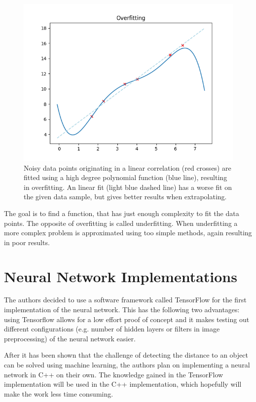 \begin{figure}[h!]
	\centering
	\includegraphics[width=4.5in]{img/methodology_neuralNetwork_overfitting.png}
	\caption{Noisy data points originating in a linear correlation (red crosses) are fitted using a high degree polynomial function (blue line), resulting in overfitting. An linear fit (light blue dashed line) has a worse fit on the given data sample, but gives better results when extrapolating.}
	\label{pic:methodology_neuralNetwork_overfitting}
\end{figure}

The goal is to find a function, that has just enough complexity to fit the data points. The opposite of overfitting is called underfitting. When underfitting a more complex problem is approximated using too simple methods, again resulting in poor results.

\section{Neural Network Implementations}
The authors decided to use a software framework called TensorFlow for the first implementation of the neural network. This has the following two advantages: using Tensorflow allows for a low effort proof of concept and it makes testing out different configurations (e.g. number of hidden layers or filters in image preprocessing) of the neural network easier.

After it has been shown that the challenge of detecting the distance to an object can be solved using machine learning, the authors plan on implementing a neural network in C++ on their own. The knowledge gained in the TensorFlow implementation will be used in the C++ implementation, which hopefully will make the work less time consuming.

